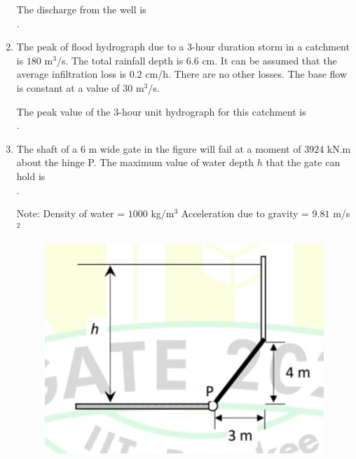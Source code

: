 \documentclass[journal,12pt,onecolumn]{article}
\theoremstyle{remark}
\begin{document}
\begin{enumerate}
    The discharge from the well  is \underline{\hspace{2cm}} \\ .
    
    \hfill{}
    
    \item The peak of flood hydrograph due to a $3$-hour duration storm in a catchment is $180$ m$^3$/s. The total rainfall depth is $6.6$ cm. It can be assumed that the average infiltration loss is $0.2$ cm/h. There are no other losses. The base flow is constant at a value of $30$ m$^3$/s.
    
    The peak value of the $3$-hour unit hydrograph for this catchment  is \underline{\hspace{2cm}} \\ .
    
    \hfill{}
    
    \item The shaft of a $6$ m wide gate in the figure  will fail at a moment of $3924$ kN.m about the hinge P. The maximum value of water depth $h$  that the gate can hold is \underline{\hspace{2cm}} \\ .
    
    Note:
    Density of water = $1000$ kg/m$^3$
    Acceleration due to gravity = $9.81$ m/s$^2$
    \begin{figure}[H]
        \centering
        \includegraphics[width=0.7\columnwidth]{figs/2q-60.jpg}
        \caption{}
        \label{fig:q60}
    \end{figure}
    

\end{enumerate}
\end{document}
